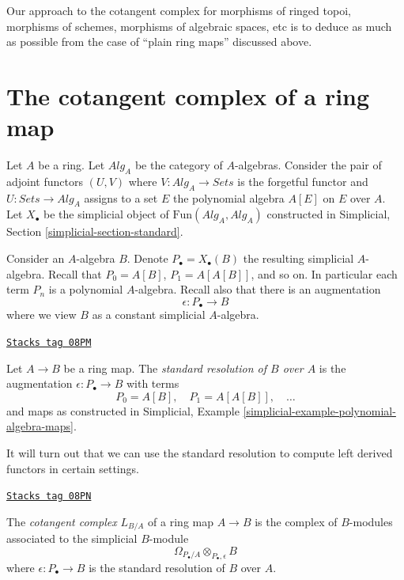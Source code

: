 \medskip\noindent
Our approach to the cotangent complex for morphisms of ringed topoi,
morphisms of schemes, morphisms of algebraic spaces, etc
is to deduce as much as possible from the case of ``plain ring maps''
discussed above.

\section{The cotangent complex of a ring map}
\label{cotangent-section-cotangent-ring-map}
Let $A$ be a ring. Let $\textit{Alg}_A$ be the category of $A$-algebras.
Consider the pair of adjoint functors $(U, V)$ where
$V : \textit{Alg}_A \to \textit{Sets}$ is the forgetful functor and
$U : \textit{Sets} \to \textit{Alg}_A$ assigns to a set $E$ the polynomial
algebra $A[E]$ on $E$ over $A$. Let $X_\bullet$ be the simplicial object of
$\text{Fun}(\textit{Alg}_A, \textit{Alg}_A)$ constructed in
Simplicial, Section \ref{simplicial-section-standard}.

\medskip\noindent
Consider an $A$-algebra $B$. Denote $P_\bullet = X_\bullet(B)$ the resulting
simplicial $A$-algebra. Recall that $P_0 = A[B]$, $P_1 = A[A[B]]$, and so on.
In particular each term $P_n$ is a polynomial $A$-algebra.
Recall also that there is an augmentation
$$
\epsilon : P_\bullet \longrightarrow B
$$
where we view $B$ as a constant simplicial $A$-algebra.

\begin{definition}
\label{cotangent-definition-standard-resolution}
\href{https://stacks.math.columbia.edu/tag/08PM}{\texttt{Stacks tag 08PM}}

Let $A \to B$ be a ring map. The {\it standard resolution of $B$ over $A$}
is the augmentation $\epsilon : P_\bullet \to B$ with terms
$$
P_0 = A[B],\quad P_1 = A[A[B]],\quad \ldots
$$
and maps as constructed in
Simplicial, Example \ref{simplicial-example-polynomial-algebra-maps}.
\end{definition}

It will turn out that we can use the standard resolution
to compute left derived functors in certain settings.

\begin{definition}
\label{cotangent-definition-cotangent-complex-ring-map}
\href{https://stacks.math.columbia.edu/tag/08PN}{\texttt{Stacks tag 08PN}}

The {\it cotangent complex} $L_{B/A}$ of a ring map $A \to B$
is the complex of $B$-modules associated to the simplicial $B$-module
$$
\Omega_{P_\bullet/A} \otimes_{P_\bullet, \epsilon} B
$$
where $\epsilon : P_\bullet \to B$ is the standard resolution
of $B$ over $A$.
\end{definition}

